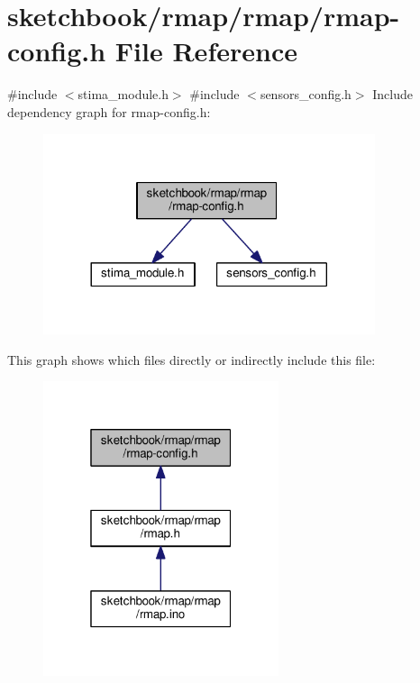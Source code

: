 \hypertarget{rmap-config_8h}{}\section{sketchbook/rmap/rmap/rmap-\/config.h File Reference}
\label{rmap-config_8h}
{\ttfamily \#include $<$stima\+\_\+module.\+h$>$}\newline
{\ttfamily \#include $<$sensors\+\_\+config.\+h$>$}\newline
Include dependency graph for rmap-\/config.h\+:\nopagebreak
\begin{figure}[H]
\begin{center}
\leavevmode
\includegraphics[width=276pt]{rmap-config_8h__incl}
\end{center}
\end{figure}
This graph shows which files directly or indirectly include this file\+:\nopagebreak
\begin{figure}[H]
\begin{center}
\leavevmode
\includegraphics[width=196pt]{rmap-config_8h__dep__incl}
\end{center}
\end{figure}

